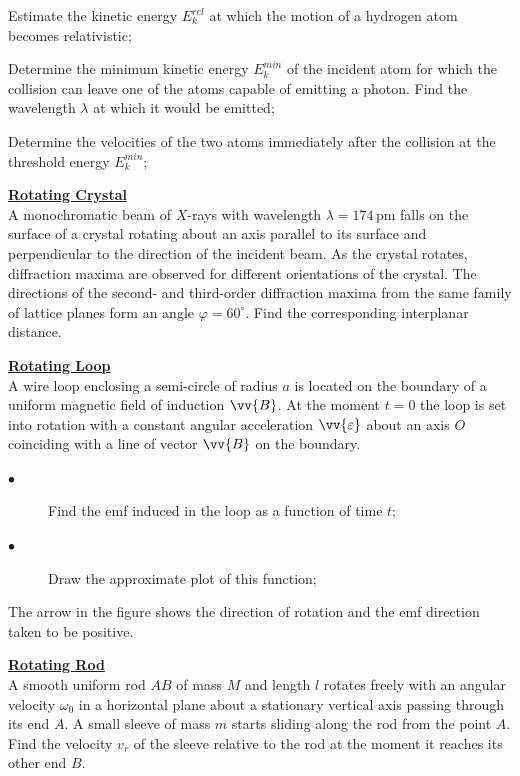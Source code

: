\documentclass[a4paper]{article}
\begin{document}
	\begin{description}[leftmargin=!, labelwidth=\widthof{$\bullet$}]
		\item[$\bullet$] Estimate the kinetic energy $E_{k}^{rel}$ at which the motion of a hydrogen atom becomes relativistic;
		\item[$\bullet$] Determine the minimum kinetic energy $E_{k}^{min}$ of the incident atom for which the collision can leave one of the atoms capable of emitting a photon. Find the wavelength $\lambda$ at which it would be emitted;
		\item[$\bullet$] Determine the velocities of the two atoms immediately after the collision at the threshold energy $E_{k}^{min}$;
	\end{description}
	
	\Problem
	\textbf{\underline{Rotating Crystal}}
	\\
	A monochromatic beam of $X$-rays with wavelength $\lambda=174\,\mathrm{pm}$ falls on the surface of a crystal rotating about an axis parallel to its surface and perpendicular to the direction of the incident beam. As the crystal rotates, diffraction maxima are observed for different orientations of the crystal. The directions of the second- and third-order diffraction maxima from the same family of lattice planes form an angle $\varphi=60^\circ$. Find the corresponding interplanar distance.
	
	\Problem
	\textbf{\underline{Rotating Loop}}
	\\
	A wire loop enclosing a semi-circle of radius $a$ is located on the boundary of a uniform magnetic field of induction $\vv{B}$. At the moment $t=0$ the loop is set into rotation with a constant angular acceleration $\vv{\varepsilon}$ about an axis $O$ coinciding with a line of vector $\vv{B}$ on the boundary. 
	\begin{description}
		\item[$\bullet$] Find the emf induced in the loop as a function of time $t$;
		\item[$\bullet$] Draw the approximate plot of this function;
	\end{description}
	The arrow in the figure shows the direction of rotation and the emf direction taken to be positive.
	
	
	
	\Problem
	\textbf{\underline{Rotating Rod}}
	\\
	A smooth uniform rod $AB$ of mass $M$ and length $l$ rotates freely with an angular velocity $\omega_0$ in a horizontal plane about a stationary vertical axis passing through its end $A$. A small sleeve of mass $m$ starts sliding along the rod from the point $A$. Find the velocity $v_r$ of the sleeve relative to the rod at the moment it reaches its other end $B$.
	
\end{document}
